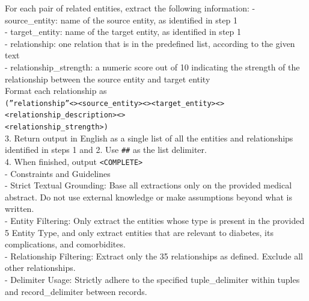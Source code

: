 \documentclass[10pt]{article}
\begin{document}
\begin{appendices}
\begin{tcolorbox}
For each pair of related entities, extract the following information:
- source\_entity: name of the source entity, as identified in step 1\\
- target\_entity: name of the target entity, as identified in step 1\\
- relationship: one relation that is in the predefined list, according to the given text\\
- relationship\_strength: a numeric score out of 10 indicating the strength of the relationship between the source entity and target entity\\
Format each relationship as \\
\texttt{(''relationship''\textless\textbar\textgreater\textless source\_entity\textgreater\textless\textbar\textgreater\textless target\_entity\textgreater\textless\textbar\textgreater\textless relationship\_description\textgreater\textless\textbar\textgreater\\
\textless relationship\_strength\textgreater)}\\
 
3. Return output in English as a single list of all the entities and relationships identified in steps 1 and 2. Use \texttt{\#\#} as the list delimiter.\\
 
4. When finished, output \texttt{\textless\textbar COMPLETE\textbar\textgreater}\\

- Constraints and Guidelines\\
- Strict Textual Grounding: Base all extractions only on the provided medical abstract. Do not use external knowledge or make assumptions beyond what is written.\\
- Entity Filtering: Only extract the entities whose type is present in the provided 5 Entity Type, and only extract entities that are relevant to diabetes, its complications, and comorbidites. \\
- Relationship Filtering: Extract only the 35 relationships as defined. Exclude all other relationships.\\
- Delimiter Usage: Strictly adhere to the specified {tuple\_delimiter} within tuples and {record\_delimiter} between records.\\
    
\end{tcolorbox}

\begin{tcolorbox}[
    title=E2: GraphRAG Index Example,
    halign title=center,
  colback=white,        %
  colframe=blue,       %
  breakable,
  boxrule=0.8pt,        %
  arc=4mm,              %
  left=4pt,             %
  right=4pt,            %
  top=4pt,              %
  bottom=4pt,            %
  fontupper=\small
]
\label{prompt:GraphRAG-index-example}


\end{tcolorbox}
\end{appendices}
\end{document}
